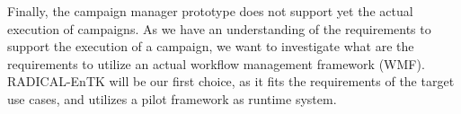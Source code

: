 Finally, the campaign manager prototype does not support yet the actual execution of campaigns.
As we have an understanding of the requirements to support the execution of a campaign, we want to investigate what are the requirements to utilize an actual workflow management framework (WMF).
RADICAL-EnTK will be our first choice, as it fits the requirements of the target use cases, and utilizes a pilot framework as runtime system.

